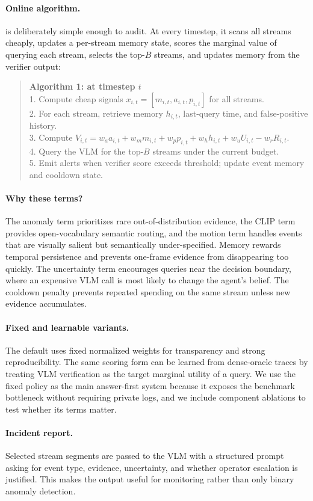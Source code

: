\paragraph{Online algorithm.}
\method{} is deliberately simple enough to audit. At every timestep, it scans all streams cheaply, updates a per-stream memory state, scores the marginal value of querying each stream, selects the top-$B$ streams, and updates memory from the verifier output:

\begin{quote}
\small
\textbf{Algorithm 1: \method{} at timestep $t$}\\
1. Compute cheap signals $x_{i,t}=[m_{i,t},a_{i,t},p_{i,t}]$ for all streams.\\
2. For each stream, retrieve memory $h_{i,t}$, last-query time, and false-positive history.\\
3. Compute $V_{i,t}=w_a a_{i,t}+w_m m_{i,t}+w_p p_{i,t}+w_h h_{i,t}+w_u U_{i,t}-w_r R_{i,t}$.\\
4. Query the VLM for the top-$B$ streams under the current budget.\\
5. Emit alerts when verifier score exceeds threshold; update event memory and cooldown state.
\end{quote}

\paragraph{Why these terms?}
The anomaly term prioritizes rare out-of-distribution evidence, the CLIP term provides open-vocabulary semantic routing, and the motion term handles events that are visually salient but semantically under-specified. Memory rewards temporal persistence and prevents one-frame evidence from disappearing too quickly. The uncertainty term encourages queries near the decision boundary, where an expensive VLM call is most likely to change the agent's belief. The cooldown penalty prevents repeated spending on the same stream unless new evidence accumulates.

\paragraph{Fixed and learnable variants.}
The default \method{} uses fixed normalized weights for transparency and strong reproducibility. The same scoring form can be learned from dense-oracle traces by treating VLM verification as the target marginal utility of a query. We use the fixed policy as the main answer-first system because it exposes the benchmark bottleneck without requiring private logs, and we include component ablations to test whether its terms matter.

\paragraph{Incident report.}
Selected stream segments are passed to the VLM with a structured prompt asking for event type, evidence, uncertainty, and whether operator escalation is justified. This makes the output useful for monitoring rather than only binary anomaly detection.

